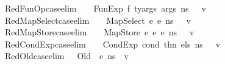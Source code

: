 \begin{isabellebody}
\isamarkupfalse%
\ RedFunOp{\isacharunderscore}{\kern0pt}case{\isacharbrackleft}{\kern0pt}elim{\isacharbang}{\kern0pt}{\isacharbrackright}{\kern0pt}{\isacharcolon}{\kern0pt}\ {\isachardoublequoteopen}{\isasymLambda}{\isacharcomma}{\kern0pt}{\isasymGamma}{\isacharcomma}{\kern0pt}{\isasymOmega}\ {\isasymturnstile}\ {\isasymlangle}\ FunExp\ f\ ty{\isacharunderscore}{\kern0pt}args\ args{\isacharcomma}{\kern0pt}\ n{\isacharunderscore}{\kern0pt}s\ {\isasymrangle}\ {\isasymDown}\ v{\isachardoublequoteclose}\isanewline
{}\isamarkupfalse%
\ RedMapSelect{\isacharunderscore}{\kern0pt}case{\isacharbrackleft}{\kern0pt}elim{\isacharbang}{\kern0pt}{\isacharbrackright}{\kern0pt}{\isacharcolon}{\kern0pt}\ {\isachardoublequoteopen}{\isasymLambda}{\isacharcomma}{\kern0pt}{\isasymGamma}{\isacharcomma}{\kern0pt}{\isasymOmega}\ {\isasymturnstile}\ {\isasymlangle}\ MapSelect\ e{}\ e{}{\isacharcomma}{\kern0pt}\ n{\isacharunderscore}{\kern0pt}s\ {\isasymrangle}\ {\isasymDown}\ v{\isachardoublequoteclose}\isanewline
{}\isamarkupfalse%
\ RedMapStore{\isacharunderscore}{\kern0pt}case{\isacharbrackleft}{\kern0pt}elim{\isacharbang}{\kern0pt}{\isacharbrackright}{\kern0pt}{\isacharcolon}{\kern0pt}\ {\isachardoublequoteopen}{\isasymLambda}{\isacharcomma}{\kern0pt}{\isasymGamma}{\isacharcomma}{\kern0pt}{\isasymOmega}\ {\isasymturnstile}\ {\isasymlangle}\ MapStore\ e{}\ e{}\ e{}{\isacharcomma}{\kern0pt}\ n{\isacharunderscore}{\kern0pt}s\ {\isasymrangle}\ {\isasymDown}\ v{\isachardoublequoteclose}\isanewline
{}\isamarkupfalse%
\ RedCondExp{\isacharunderscore}{\kern0pt}case{\isacharbrackleft}{\kern0pt}elim{\isacharbang}{\kern0pt}{\isacharbrackright}{\kern0pt}{\isacharcolon}{\kern0pt}\ {\isachardoublequoteopen}{\isasymLambda}{\isacharcomma}{\kern0pt}{\isasymGamma}{\isacharcomma}{\kern0pt}{\isasymOmega}\ {\isasymturnstile}\ {\isasymlangle}\ CondExp\ cond\ thn\ els{\isacharcomma}{\kern0pt}\ n{\isacharunderscore}{\kern0pt}s\ {\isasymrangle}\ {\isasymDown}\ v{\isachardoublequoteclose}\isanewline
{}\isamarkupfalse%
\ RedOld{\isacharunderscore}{\kern0pt}case{\isacharbrackleft}{\kern0pt}elim{\isacharbang}{\kern0pt}{\isacharbrackright}{\kern0pt}{\isacharcolon}{\kern0pt}\ {\isachardoublequoteopen}{\isasymLambda}{\isacharcomma}{\kern0pt}{\isasymGamma}{\isacharcomma}{\kern0pt}{\isasymOmega}\ {\isasymturnstile}\ {\isasymlangle}Old\ \ e{\isacharcomma}{\kern0pt}\ n{\isacharunderscore}{\kern0pt}s{\isasymrangle}\ {\isasymDown}\ v{\isachardoublequoteclose}\isanewline

\end{isabellebody}
